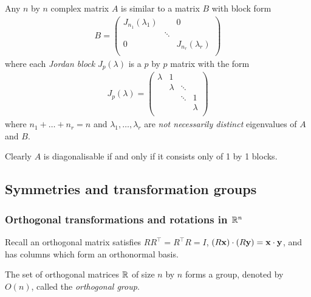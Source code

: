 \documentclass{../../template/note}
\begin{document}
    \begin{theorem}
        Any \(n\) by \(n\) complex matrix \(A\) is similar to a matrix \(B\) with block form
        \begin{align*}
            B = \begin{pmatrix}
                J_{n_1}(\lambda_1) & & 0 \\
                 & \ddots & \\
                0 & & J_{n_r}(\lambda_r) \\
            \end{pmatrix}
        \end{align*}
        where each \emph{Jordan block} \(J_p(\lambda)\) is a \(p\) by \(p\) matrix with the form
        \begin{align*}
            J_p(\lambda) = \begin{pmatrix}
                \lambda & 1 &  &  \\
                 & \lambda & \ddots &  \\
                 &  & \ddots & 1 \\
                 &  &  & \lambda \\
            \end{pmatrix}
        \end{align*}
        where \(n_1 + \dots + n_r = n\) and \(\lambda_1, \dots, \lambda_r\) are \emph{not necessarily distinct} eigenvalues of \(A\) and \(B\).
    \end{theorem}
    
    Clearly \(A\) is diagonalisable if and only if it consists only of 1 by 1 blocks.

    \subsection{Symmetries and transformation groups}

    \subsubsection{Orthogonal transformations and rotations in \(\mathbb R^n\)}

    Recall an orthogonal matrix satisfies \(RR^\intercal = R^\intercal R = I\), \((R\V x) \cdot (R\V y) = \V x \cdot \V y\), and has columns which form an orthonormal basis.
    
    \begin{definition}
        The set of orthogonal matrices \(\mathbb R\) of size \(n\) by \(n\) forms a group, denoted by \(O(n)\), called the \emph{orthogonal group}.
    \end{definition}
    
\end{document}
